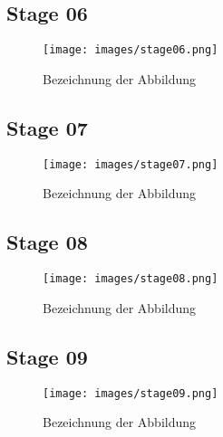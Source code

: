 \subsection{Stage 06}
\begin{figure} %
	\centering
	\texttt{[image: images/stage06.png]}
	\caption{Bezeichnung der Abbildung}
	\label{a1}
\end{figure}


\subsection{Stage 07}
\begin{figure} %
	\centering
	\texttt{[image: images/stage07.png]}
	\caption{Bezeichnung der Abbildung}
	\label{a1}
\end{figure}


\subsection{Stage 08}
\begin{figure} %
	\centering
	\texttt{[image: images/stage08.png]}
	\caption{Bezeichnung der Abbildung}
	\label{a1}
\end{figure}


\subsection{Stage 09}
\begin{figure} %
	\centering
	\texttt{[image: images/stage09.png]}
	\caption{Bezeichnung der Abbildung}
	\label{a1}
\end{figure}


